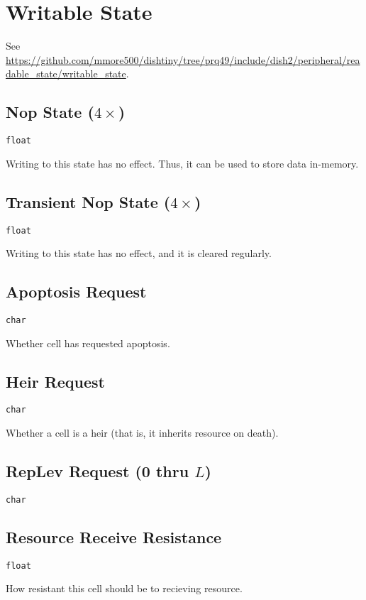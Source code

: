 \section{Writable State}

See \url{https://github.com/mmore500/dishtiny/tree/prq49/include/dish2/peripheral/readable_state/writable_state}.

\subsection{Nop State ($4\times$)}

\texttt{float}

Writing to this state has no effect. Thus, it can be used to store data in-memory.

\subsection{Transient Nop State ($4\times$)}

\texttt{float}

Writing to this state has no effect, and it is cleared regularly.

\subsection{Apoptosis Request}

\texttt{char}

Whether cell has requested apoptosis.

\subsection{Heir Request}

\texttt{char}

Whether a cell is a heir (that is, it inherits resource on death).

\subsection{RepLev Request (0 thru $L$)}

\texttt{char}

\subsection{Resource Receive Resistance}

\texttt{float}

How resistant this cell should be to recieving resource.

